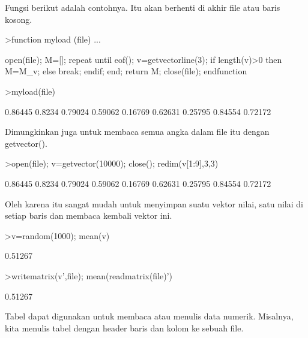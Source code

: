 \documentclass[a4paper,10pt]{article}
\begin{document}
\begin{eulernotebook}
\begin{eulercomment}
\begin{eulercomment}
\begin{eulercomment}
Fungsi berikut adalah contohnya. Itu akan berhenti di akhir file atau
baris kosong.
\end{eulercomment}
\begin{eulerprompt}
>function myload (file) ...
\end{eulerprompt}
\begin{eulerudf}
  open(file);
  M=[];
  repeat
     until eof();
     v=getvectorline(3);
     if length(v)>0 then M=M_v; else break; endif;
  end;
  return M;
  close(file);
  endfunction
\end{eulerudf}
\begin{eulerprompt}
>myload(file)
\end{eulerprompt}
\begin{euleroutput}
    0.86445    0.8234   0.79024 
    0.59062   0.16769   0.62631 
    0.25795   0.84554   0.72172 
\end{euleroutput}
\begin{eulercomment}
Dimungkinkan juga untuk membaca semua angka dalam file itu dengan
getvector().
\end{eulercomment}
\begin{eulerprompt}
>open(file); v=getvector(10000); close(); redim(v[1:9],3,3)
\end{eulerprompt}
\begin{euleroutput}
    0.86445    0.8234   0.79024 
    0.59062   0.16769   0.62631 
    0.25795   0.84554   0.72172 
\end{euleroutput}
\begin{eulercomment}
Oleh karena itu sangat mudah untuk menyimpan suatu vektor nilai, satu
nilai di setiap baris dan membaca kembali vektor ini.
\end{eulercomment}
\begin{eulerprompt}
>v=random(1000); mean(v)
\end{eulerprompt}
\begin{euleroutput}
  0.51267
\end{euleroutput}
\begin{eulerprompt}
>writematrix(v',file); mean(readmatrix(file)')
\end{eulerprompt}
\begin{euleroutput}
  0.51267
\end{euleroutput}
\begin{eulercomment}
Tabel dapat digunakan untuk membaca atau menulis data numerik.
Misalnya, kita menulis tabel dengan header baris dan kolom ke sebuah
file.
\end{eulercomment}

\end{eulercomment}
\end{eulercomment}
\end{eulernotebook}
\end{document}
